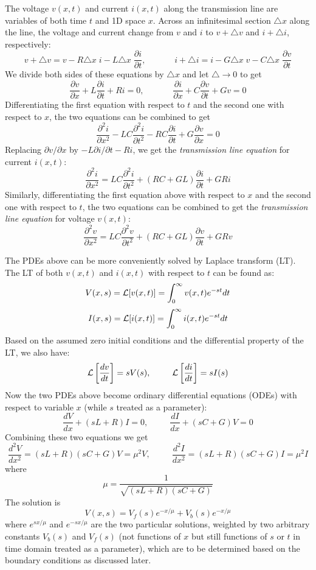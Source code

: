 The voltage $v(x,t)$ and current $i(x,t)$ along the transmission
line are variables of both time $t$ and 1D space $x$. Across an
infinitesimal section $\triangle x$ along the line, the voltage and 
current change from $v$ and $i$ to $v+\triangle v$ and 
$i+\triangle i$, respectively: 
\[ v+\triangle v=v-R\triangle x\; i-L\triangle x \;\frac{\partial i}{\partial t},
\;\;\;\;\;\;\;\;\;\;\;\;
i+\triangle i=i-G\triangle x\; v-C\triangle x\; \frac{\partial v}{\partial t} \]
We divide both sides of these equations by $\triangle x$ and let $\triangle\rightarrow 0$
to get
\[
\frac{\partial v}{\partial x}+L \frac{\partial i}{\partial t}+Ri=0,
\;\;\;\;\;\;\;\;\;\;\;\;
\frac{\partial i}{\partial x}+C \frac{\partial v}{\partial t}+Gv=0
\]
Differentiating the first equation with respect to $t$ and the second one
with respect to $x$, the two equations can be combined to get 
\[	\frac{\partial^2 i}{\partial x^2}-LC\frac{\partial^2 i}{\partial t^2}
	-RC\frac{\partial i}{\partial t}+G\frac{\partial v}{\partial x}=0
\]
Replacing $\partial v/\partial x$ by $-L \partial i/\partial t-Ri$, we get
the {\em transmission line equation} for current $i(x,t)$:
\[	\frac{\partial^2 i}{\partial x^2}=LC\frac{\partial^2 i}{\partial t^2}
	+(RC+GL)\frac{\partial i}{\partial t}+GRi
\]
Similarly, differentiating the first equation above with respect to $x$ and 
the second one with respect to $t$, the two equations can be combined 
to get the {\em transmission line equation} for voltage $v(x,t)$:
\[	\frac{\partial^2 v}{\partial x^2}=LC\frac{\partial^2 v}{\partial t^2}
	+(RC+GL)\frac{\partial v}{\partial t}+GRv
\]

The PDEs above can be more conveniently solved by Laplace transform (LT).
The LT of both $v(x,t)$ and $i(x,t)$ with respect to $t$ can be found as:
\[ 	V(x,s)={\cal L}[v(x,t)]=\int_0^\infty v(x,t)e^{-st}dt	\]
\[ 	I(x,s)={\cal L}[i(x,t)]=\int_0^\infty i(x,t)e^{-st}dt	\]
Based on the assumed zero initial conditions and the differential property of
the LT, we also have:
\[ {\cal L}\left[\frac{dv}{dt}\right]=sV(s),\;\;\;\;\;\;\;\;\;
{\cal L}\left[\frac{di}{dt}\right]=sI(s) \]
Now the two PDEs above become ordinary differential equations (ODEs) with respect 
to variable $x$ (while $s$ treated as a parameter):
\[ \frac{dV}{dx}+(sL+R)I=0,\;\;\;\;\;\;\;\;\;\frac{dI}{dx}+(sC+G)V=0 \]
Combining these two equations we get
\[ \frac{d^2V}{dx^2}=(sL+R)(sC+G)V=\mu^2V,\;\;\;\;\;\;\;\;\;
\frac{d^2I}{dx^2}=(sL+R)(sC+G)I=\mu^2I \]
where 
\[ \mu=\frac{1}{\sqrt{(sL+R)(sC+G)}} \]
The solution is
\[ V(x,s)=V_f(s) e^{-x/\mu}+V_b(s) e^{-x/\mu} \]
where $e^{sx/\mu}$ and $e^{-sx/\mu}$ are the two particular solutions, weighted
by two arbitrary constants $V_b(s)$ and $V_f(s)$ (not functions of $x$ but 
still functions of $s$ or $t$ in time domain treated as a parameter), which
are to be determined based on the boundary conditions as discussed later. 

